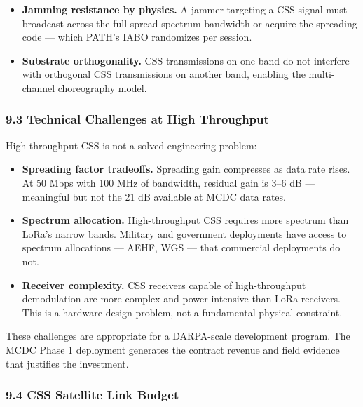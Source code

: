 \documentclass[
  11pt,
]{article}
\providecommand{\tightlist}{%
  \setlength{\itemsep}{0pt}\setlength{\parskip}{0pt}}
\begin{document}
\begin{itemize}
\tightlist
\item
  \textbf{Jamming resistance by physics.} A jammer targeting a CSS
  signal must broadcast across the full spread spectrum bandwidth or
  acquire the spreading code --- which PATH's IABO randomizes per
  session.
\item
  \textbf{Substrate orthogonality.} CSS transmissions on one band do not
  interfere with orthogonal CSS transmissions on another band, enabling
  the multi-channel choreography model.
\end{itemize}

\hypertarget{technical-challenges-at-high-throughput}{%
\subsubsection{9.3 Technical Challenges at High
Throughput}\label{technical-challenges-at-high-throughput}}

High-throughput CSS is not a solved engineering problem:

\begin{itemize}
\tightlist
\item
  \textbf{Spreading factor tradeoffs.} Spreading gain compresses as data
  rate rises. At 50 Mbps with 100 MHz of bandwidth, residual gain is
  3--6 dB --- meaningful but not the 21 dB available at MCDC data rates.
\item
  \textbf{Spectrum allocation.} High-throughput CSS requires more
  spectrum than LoRa's narrow bands. Military and government deployments
  have access to spectrum allocations --- AEHF, WGS --- that commercial
  deployments do not.
\item
  \textbf{Receiver complexity.} CSS receivers capable of high-throughput
  demodulation are more complex and power-intensive than LoRa receivers.
  This is a hardware design problem, not a fundamental physical
  constraint.
\end{itemize}

These challenges are appropriate for a DARPA-scale development program.
The MCDC Phase 1 deployment generates the contract revenue and field
evidence that justifies the investment.

\hypertarget{css-satellite-link-budget}{%
\subsubsection{9.4 CSS Satellite Link
Budget}\label{css-satellite-link-budget}}
\end{document}
